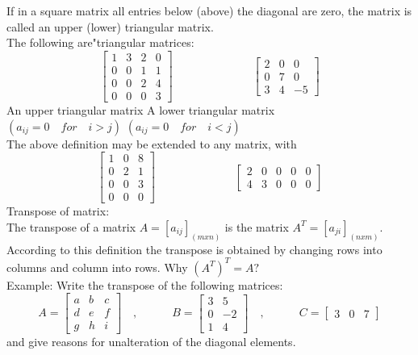 \documentclass[11pt]{amsbook}
\begin{document}
If in a square matrix all entries below (above) the diagonal are zero, the matrix is called an upper (lower) triangular matrix.\\
The following are"triangular matrices:\\
$$
\begin{bmatrix} 
1 & 3 & 2 & 0\\
0 & 0 & 1 & 1\\
0 & 0 & 2 & 4\\
0 & 0 & 0 & 3
\end{bmatrix}
\quad
\quad
\quad
\quad
\quad
\quad
\quad
\begin{bmatrix} 
2 & 0 & 0\\
0 & 7 & 0\\
3 & 4 & -5
\end{bmatrix}
$$
\quad
\quad
\quad
\quad
\quad
\quad
\quad
\quad
An upper triangular matrix
\quad
A lower triangular matrix\\

\quad
\quad
\quad
\quad
\quad
\quad
\quad
$(a_{ij}=0\quad for\quad i>j)$
\quad
\quad
\quad
$(a_{ij}=0\quad for\quad i<j)$\\

The above definition may be extended to any matrix, with\\
$$
\begin{bmatrix} 
1 & 0 & 8\\
0 & 2 & 1\\
0 & 0 & 3\\
0 & 0 & 0
\end{bmatrix}
\quad
\quad
\quad
\quad
\quad
\quad
\quad
\begin{bmatrix} 
2 & 0 & 0 & 0 & 0\\
4 & 3 & 0 & 0 & 0
\end{bmatrix}
$$
\hfill \break
{\fontsize{15}{30}\selectfont Transpose of matrix:}\\

The transpose of a matrix $A={[a_{ij}]}_{(mxn)}$ is the matrix $A^{T}={[a_{ji}]}_{(nxm)}$. According to this definition the transpose is obtained by changing rows into columns and column into rows. Why $(A^{T})^{T}= A ?$\\

Example: Write the transpose of the following matrices: 
\hfill \break
$$
A=
\begin{bmatrix} 
a & b & c\\
d & e & f\\
g & h & i
\end{bmatrix}
\quad
,
\quad
\quad
\quad
B=
\begin{bmatrix} 
3 & 5\\
0 & -2\\
1 & 4
\end{bmatrix}
\quad
,
\quad
\quad
\quad
C=
\begin{bmatrix} 
3 & 0 & 7
\end{bmatrix}
$$
\hfill \break
and give reasons for unalteration of the diagonal elements.\\
\hfill \break
\quad
\quad
\quad
\quad
\quad
\end{document}

